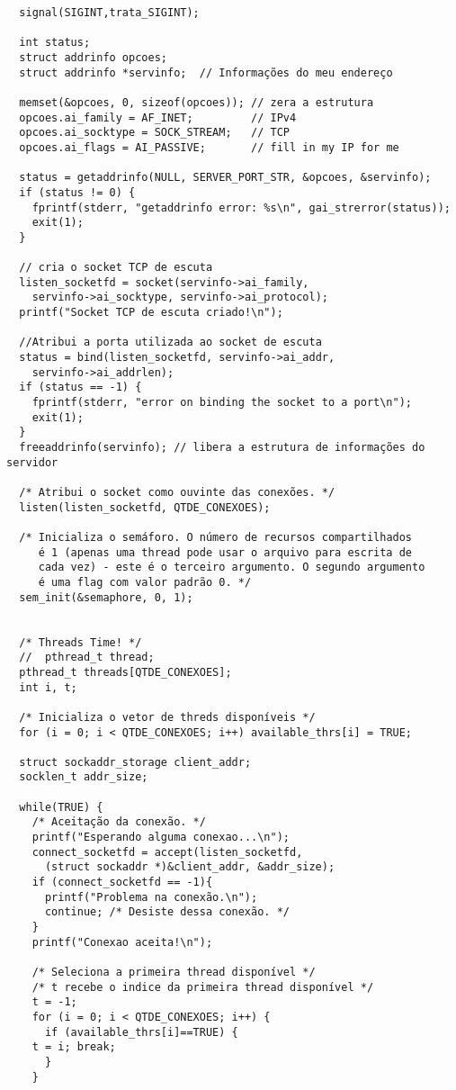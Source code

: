 \documentclass[11pt,twoside]{article}
\begin{document}
\begin{verbatim}
  signal(SIGINT,trata_SIGINT);

  int status;
  struct addrinfo opcoes;
  struct addrinfo *servinfo;  // Informações do meu endereço

  memset(&opcoes, 0, sizeof(opcoes)); // zera a estrutura
  opcoes.ai_family = AF_INET;         // IPv4
  opcoes.ai_socktype = SOCK_STREAM;   // TCP
  opcoes.ai_flags = AI_PASSIVE;       // fill in my IP for me

  status = getaddrinfo(NULL, SERVER_PORT_STR, &opcoes, &servinfo);
  if (status != 0) {
    fprintf(stderr, "getaddrinfo error: %s\n", gai_strerror(status));
    exit(1);
  }

  // cria o socket TCP de escuta
  listen_socketfd = socket(servinfo->ai_family,
    servinfo->ai_socktype, servinfo->ai_protocol);
  printf("Socket TCP de escuta criado!\n");
  
  //Atribui a porta utilizada ao socket de escuta
  status = bind(listen_socketfd, servinfo->ai_addr,
    servinfo->ai_addrlen); 
  if (status == -1) {
    fprintf(stderr, "error on binding the socket to a port\n");
    exit(1);
  }
  freeaddrinfo(servinfo); // libera a estrutura de informações do servidor

  /* Atribui o socket como ouvinte das conexões. */
  listen(listen_socketfd, QTDE_CONEXOES);

  /* Inicializa o semáforo. O número de recursos compartilhados 
     é 1 (apenas uma thread pode usar o arquivo para escrita de
     cada vez) - este é o terceiro argumento. O segundo argumento
     é uma flag com valor padrão 0. */
  sem_init(&semaphore, 0, 1);


  /* Threads Time! */
  //  pthread_t thread;
  pthread_t threads[QTDE_CONEXOES];
  int i, t;

  /* Inicializa o vetor de threds disponíveis */
  for (i = 0; i < QTDE_CONEXOES; i++) available_thrs[i] = TRUE;

  struct sockaddr_storage client_addr;
  socklen_t addr_size;

  while(TRUE) {
    /* Aceitação da conexão. */
    printf("Esperando alguma conexao...\n");
    connect_socketfd = accept(listen_socketfd,
      (struct sockaddr *)&client_addr, &addr_size);
    if (connect_socketfd == -1){
      printf("Problema na conexão.\n");
      continue; /* Desiste dessa conexão. */
    }
    printf("Conexao aceita!\n");
    
    /* Seleciona a primeira thread disponível */
    /* t recebe o indice da primeira thread disponível */
    t = -1;
    for (i = 0; i < QTDE_CONEXOES; i++) {
      if (available_thrs[i]==TRUE) {
	t = i; break;
      }
    }
    

\end{verbatim}
\end{document}

